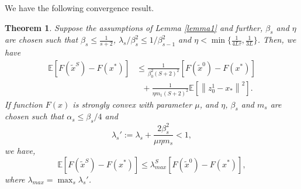 \documentclass[letterpaper]{article} %
\newcommand*{\E}{\mathbb{E}}
\newcommand{\norm}[1]{\left\lVert#1\right\rVert}
\newtheorem{theorem}{Theorem}
\begin{document}
We have the following convergence result.
\begin{theorem}\label{conve-theorem}
Suppose the assumptions of Lemma \ref{lemma1} and further, $\beta_s$ and $\eta$ are chosen such that $\beta_s\leq \frac{1}{s+2}$,  $\lambda_s/\beta_s^2 \leq 1/\beta_{s-1}^2$ and $\eta < \min\{\frac{1}{4L
\tau}, \frac{1}{3L}\}$. 
Then, we have
\begin{equation}
\begin{split}
{\E[F(\widetilde{x}^S)-F(x^*)]}&\leq \frac{1}{\beta_{0}^2(S+2)^2}[F(\widetilde{x}^{0})-F(x^*)] \\ 
&~~~ + {\frac{1}{\eta m_{1}(S+2)^2}}\E[\norm{z_{0}^1-x_*}^2].
\end{split}
\end{equation}
If function $F(x)$ is strongly convex with parameter $\mu$, and $\eta$, $\beta_s$ and $m_s$ are chosen such that $\alpha_s\leq \beta_s/4$ and
\[
\lambda_s' := \lambda_s+{\frac{2 \beta_s^2}{\mu\eta m_s}} < 1,
\]
we have, 
\begin{equation}
\E\left[F(\widetilde{x}^S)-F(x^*)\right]\leq \lambda_{max}^S\left[F(\widetilde{x}^0)-F(x^*)\right],
\end{equation}
where $\lambda_{max} = \max_{s}{\lambda_s'}$.
\end{theorem}
\end{document}
